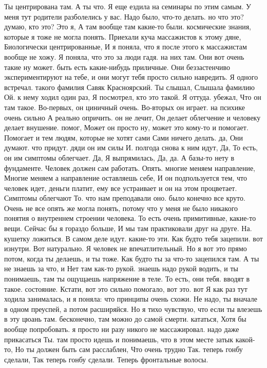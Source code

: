 Ты центрирована там.
А ты что.
Я еще ездила на семинары по этим самым.
У меня тут родители разболелись у вас.
Надо было, что-то делать.
но что это?
думаю, кто это? Это я, А там вообще там какие-то были.
космические знания, которые я тоже не могла понять. Приехали куча массажистов к этому дяне, Биологически центрированные, И я поняла, что я после этого к массажистам вообще не хожу. Я поняла, что это за люди гадя.
на них там. Они вот очень такие ну может.
быть есть какие-нибудь приличные. Они беззастенчиво экспериментируют на тебе, и они могут тебя просто сильно навредить. Я одного встречал.
такого фамилия Савяк Красноярский. Ты слышал, Слышала фамилию Ой.
к нему ходил один раз, Я посмотрел, кто это такой. Я оттуда.
убежал, Что он там такое.
Во-первых, он циничный очень.
Во-вторых он играет.
на психике очень сильно А реально опричить. он не лечит, Он делает облегчение и
человеку делает внушение.
помог, Может он просто ну, может это кому-то и помогает. Помогает и тем людям, которые не хотят сами Сами ничего делать.
да, Они думают.
что придут. дяди он им силы И.
полгода снова к ним идут, Да, То есть, он им симптомы облегчает. Да, Я выпрямилась, Да, да.
А базы-то нету в фундаменте. Человек должен сам работать.
Опять. многие меняем направление, Многие меняем а направление оставляешь себе, И он подпользуется тем, что человек идет, деньги платит, ему все устраивает и он на этом процветает. Симптомы облегчают То.
что нам преподавали оно.
было конечно все круто.
Очень не все опять же могла понять, потому что у меня не было никакого понятия о внутреннем строении человека.
То есть очень примитивные, какие-то вещи.
Сейчас бы я гораздо больше, И мы там практиковали друг на друге.
На.
кушетку ложиться. В самом деле идут.
какие-то эти.
Как будто тебя зацепили. вот изнутри.
Вот натурально.
Я человек не впечатлительный.
Но я вот это прямо потом, когда ты делаешь, и ты тоже.
Как будто ты за что-то зацепился там.
А ты не знаешь за что, и Нет там как-то рукой. знаешь надо рукой водить, и ты понимаешь, там ты ощущаешь напряжение в теле.
То есть, они тебя.
вводят в такое.
состояние. Кстати, вот это сильно помогало, вот это. вот Я как раз тут ходила занималась, и я поняла:
что принципы очень схожи.
Не надо, ты вначале в одном преуспей, а потом расширяйся. Но я тихо чувствую, что если
ты влезешь в эту цюань там.
бесконечно, там можно до самой смерти.
кататься, Хотя бы вообще попробовать. я просто ни разу никого не массажировал.
надо даже прикасаться Ты.
там просто идешь и понимаешь, что в
этом месте затык какой-то, Но ты должен быть сам расслаблен, Что очень трудно Так.
теперь гонбу сделали, Так теперь гонбу сделали. Теперь фронтальные волосы.
